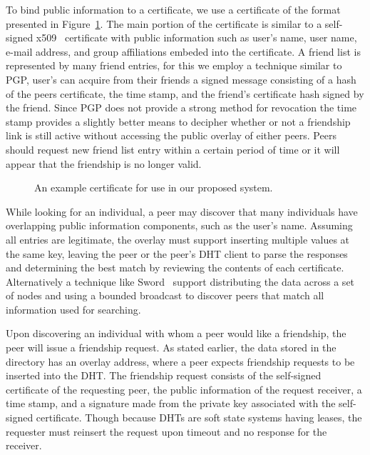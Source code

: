 \documentclass[letterpaper,twocolumn,10pt]{article}
\begin{document}
To bind public information to a certificate, we use a certificate of the format
presented in Figure~\ref{fig:certificate}.  The main portion of the certificate is 
similar to a self-signed x509~\cite{x509} certificate with public information
such as user's name, user name, e-mail address, and group affiliations embeded
into the certificate.  A friend list is represented by many friend entries, for
this we employ a technique similar to PGP, user's can acquire from their friends
a signed message consisting of a hash of the peers certificate, the time stamp,
and the friend's certificate hash signed by the friend.  Since PGP does not
provide a strong method for revocation the time stamp provides a slightly better
means to decipher whether or not a friendship link is still active without
accessing the public overlay of either peers.  Peers should request new friend
list entry within a certain period of time or it will appear that the friendship
is no longer valid.

\begin{figure}[ht]
\centering
{}
\caption{An example certificate for use in our proposed system.}
\label{fig:certificate}
\end{figure}


While looking for an individual, a peer may discover that many individuals have
overlapping public information components, such as the user's name.  Assuming
all entries are legitimate, the overlay must support inserting multiple values
at the same key, leaving the peer or the peer's DHT client to parse the
responses and determining the best match by reviewing the contents of each
certificate.  Alternatively a technique like Sword~\cite{sword} support
distributing the data across a set of nodes and using a bounded broadcast to
discover peers that match all information used for searching.

Upon discovering an individual with whom a peer would like a friendship, the
peer will issue a friendship request.  As stated earlier, the data stored in
the directory has an overlay address, where a peer expects friendship requests
to be inserted into the DHT.  The friendship request consists of the self-signed
certificate of the requesting peer, the public information of the request
receiver, a time stamp, and a signature made from the private key associated with
the self-signed certificate.  Though because DHTs are soft state systems having
leases, the requester must reinsert the request upon timeout and no response for
the receiver.
\end{document}

